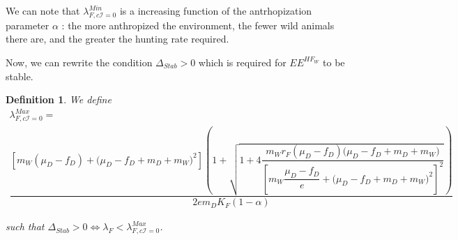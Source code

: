 \documentclass{article}
\newcommand{\lfw}{\lambda_{F}}
\newcommand{\lfw}{\lambda_{F}}
\newcommand{\cI}{c \mathcal{I}}
\newtheorem{definition}{Definition}
\begin{document}
We can note that $\lambda_{F, \cI=0}^{Min}$ is a increasing function of the antrhopization parameter $\alpha$ : the more anthropized the environment, the fewer wild animals there are, and the greater the hunting rate required. 

\medskip
Now, we can rewrite the condition $\Delta_{Stab} > 0$ which is required for $EE^{HF_W}$ to be stable.

\begin{definition}
We define
\begin{multline*}
\lambda_{F, \cI =0}^{Max}  = \\
 \dfrac{\left[m_{W}(\mu_{D}-f_{D})+\big(\mu_{D}-f_{D}+m_{D}+m_{W})^{2}\right]\left(1+\sqrt{1+4\dfrac{m_{W}r_{F}\left(\mu_{D}-f_{D}\right)\big(\mu_{D}-f_{D}+m_{D}+m_{W})}{\left[m_{W}\dfrac{\mu_{D}-f_{D}}{e}+\big(\mu_{D}-f_{D}+m_{D}+m_{W})^{2}\right]^{2}}}\right)}{2em_D K_F(1- \alpha)}
\end{multline*}

such that $\Delta_{Stab} > 0 \Leftrightarrow \lfw < \lambda_{F, \cI =0}^{Max}$.
\end{definition}
\end{document}
